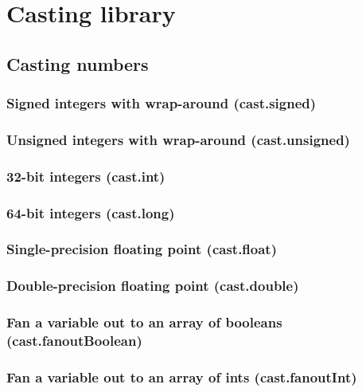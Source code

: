 \documentclass{article}
\theoremstyle{definition}
\begin{document}
\pagebreak

\section{Casting library}

\subsection{Casting numbers}

\subsubsection{Signed integers with wrap-around (cast.signed)}

\subsubsection{Unsigned integers with wrap-around (cast.unsigned)}

\subsubsection{32-bit integers (cast.int)}

\subsubsection{64-bit integers (cast.long)}

\subsubsection{Single-precision floating point (cast.float)}

\subsubsection{Double-precision floating point (cast.double)}

\subsubsection{Fan a variable out to an array of booleans (cast.fanoutBoolean)}

\subsubsection{Fan a variable out to an array of ints (cast.fanoutInt)}
\end{document}
